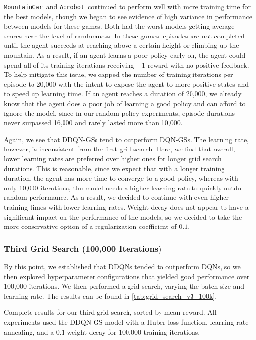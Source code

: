 \documentclass[11pt]{article}
\newcommand{\ab}{\texttt{Acrobot}}
\newcommand{\mc}{\texttt{MountainCar}}
\begin{document}
\mc~and \ab~continued to perform well with more training time for the best models, though we began to see evidence of high variance in performance between models for these games. Both had the worst models getting average scores near the level of randomness. In these games, episodes are not completed until the agent succeeds at reaching above a certain height or climbing up the mountain. As a result, if an agent learns a poor policy early on, the agent could spend all of its training iterations receiving $-1$ reward with no positive feedback. To help mitigate this issue, we capped the number of training iterations per episode to 20,000 with the intent to expose the agent to more positive states and to speed up learning time. If an agent reaches a duration of 20,000, we already know that the agent does a poor job of learning a good policy and can afford to ignore the model, since in our random policy experiments, episode durations never surpassed 16,000 and rarely lasted more than 10,000.

Again, we see that DDQN-GSs tend to outperform DQN-GSs. The learning rate, however, is inconsistent from the first grid search. Here, we find that overall, lower learning rates are preferred over higher ones for longer grid search durations. This is reasonable, since we expect that with a longer training duration, the agent has more time to converge to a good policy, whereas with only 10,000 iterations, the model needs a higher learning rate to quickly outdo random performance. As a result, we decided to continue with even higher training times with lower learning rates. Weight decay does not appear to have a significant impact on the performance of the models, so we decided to take the more conservative option of a regularization coefficient of $0.1$.

\subsubsection{Third Grid Search (100,000 Iterations)}

By this point, we established that DDQNs tended to outperform DQNs, so we then explored hyperparameter configurations that yielded good performance over 100,000 iterations. We then performed a grid search, varying the batch size and learning rate. The results can be found in \ref{tab:grid_search_v3_100k}.

\begin{table}[!ht]
    \footnotesize
    \centering
    
    
    \caption{Complete results for our third grid search, sorted by mean reward. All experiments used the DDQN-GS model with a Huber loss function, learning rate annealing, and a $0.1$ weight decay for 100,000 training iterations.}
    \label{tab:grid_search_v3_100k}
\end{table}
\end{document}
